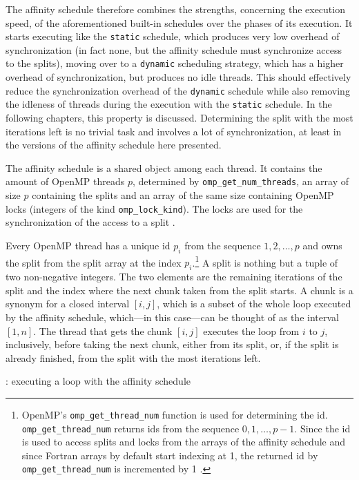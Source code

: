 \documentclass[twoside,11pt]{article}
\begin{document}
The affinity schedule therefore combines the strengths,
concerning the execution speed, of the aforementioned
built-in schedules over the phases of its execution.
It starts executing like the \texttt{static} schedule,
which produces very low overhead of synchronization (in
fact none, but the affinity schedule must synchronize
access to the splits), moving over to a \texttt{dynamic}
scheduling strategy,
which has a higher overhead of synchronization, but
produces no idle threads.
This should effectively reduce the synchronization overhead
of the \texttt{dynamic} schedule while also removing the
idleness of threads during the execution with the
\texttt{static} schedule.
In the following chapters, this property is discussed.
Determining the split with the most iterations left is no
trivial task and involves a lot of synchronization, at
least in the versions of the affinity schedule here
presented.

The affinity schedule is a shared object among each thread.
It contains the amount of OpenMP threads $p$, determined
by \texttt{omp\_get\_num\_threads}, an array of size $p$
containing the splits and an array of the same size
containing OpenMP locks (integers of the kind
\texttt{omp\_lock\_kind}).
The locks are used for the synchronization of the access
to a split \citep[see][Chapter 3]{omp}.

Every OpenMP thread has a unique id $p_i$ from the sequence
$1,2,\dots,p$ and owns the split from the split array at
the index $p_i$.\footnote{%
  OpenMP's \texttt{omp\_get\_thread\_num} function is used
  for determining the id.
  \texttt{omp\_get\_thread\_num} returns ids from the
  sequence $0,1,\dots,p-1$. Since the id is used to access
  splits and locks from the arrays of the affinity schedule
  and since Fortran arrays by default start indexing at 1,
  the returned id by \texttt{omp\_get\_thread\_num} is
  incremented by 1 \citep[see][Chapter 3]{omp}.}
A split is nothing but a tuple of two non-negative
integers. The two elements are the remaining iterations of
the split and the index where the next chunk taken from the
split starts.
A chunk is a synonym for a closed interval $[i, j]$, which
is a subset of the whole loop executed by the affinity
schedule, which---in this case---can be thought of as the
interval $[1, n]$.
The thread that gets the chunk $[i, j]$ executes the loop
from $i$ to $j$, inclusively, before taking the next chunk,
either from its split, or, if the split is already
finished, from the split with the most iterations left.

\begin{algorithm}
  \caption{: executing a loop with the affinity schedule}
  \label{alg:main}

  \begin{algorithmic}[1]
      \ELSE
      \ENDIF
    \ENDWHILE
  \end{algorithmic}
\end{algorithm}
\end{document}
